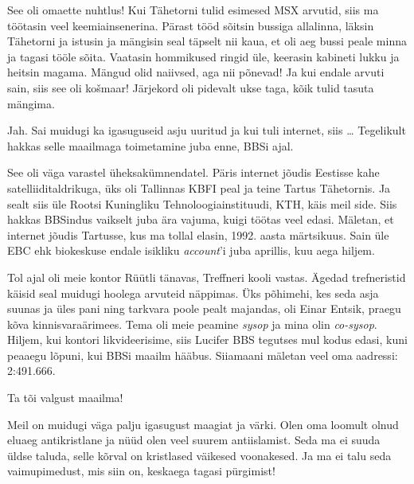 See oli omaette nuhtlus! Kui Tähetorni 
tulid esimesed MSX arvutid, siis ma töötasin veel
keemiainsenerina. Pärast tööd sõitsin bussiga allalinna, läksin Tähetorni ja 
istusin ja mängisin seal täpselt nii kaua, et oli aeg bussi peale minna ja 
tagasi tööle sõita. Vaatasin hommikused ringid üle, keerasin kabineti lukku ja heitsin
magama. Mängud olid naiivsed, aga nii põnevad! Ja kui endale 
arvuti sain, siis see oli košmaar! Järjekord oli pidevalt ukse taga, kõik tulid 
tasuta mängima. 

Jah. Sai muidugi ka igasuguseid asju uuritud ja kui tuli internet, siis \ldots 
Tegelikult hakkas selle maailmaga toimetamine juba enne, BBSi ajal.


See oli väga varastel üheksakümnendatel. Päris internet jõudis Eestisse 
kahe satelliiditaldrikuga, üks oli Tallinnas KBFI peal ja teine Tartus 
Tähetornis. Ja sealt siis üle Rootsi Kuningliku 
Tehnoloogiainstituudi, KTH, käis meil 
side. Siis hakkas BBSindus vaikselt juba ära vajuma, kuigi töötas veel 
edasi. Mäletan, et internet jõudis Tartusse, kus ma tollal elasin, 
1992. aasta märtsikuus. Sain üle EBC ehk biokeskuse endale 
isikliku \emph{account}'i juba aprillis, kuu aega hiljem.

Tol ajal oli meie kontor Rüütli tänavas, Treffneri kooli vastas. Ägedad trefneristid käisid seal muidugi 
hoolega arvuteid näppimas. Üks põhimehi, kes seda asja suunas ja üles pani ning tarkvara poole pealt
majandas, oli Einar Entsik, 
praegu kõva kinnisvaraärimees. Tema oli meie peamine \emph{sysop} ja mina 
olin \emph{co-sysop}. Hiljem, kui kontori likvideerisime, siis Lucifer 
BBS tegutses mul kodus edasi, kuni peaaegu lõpuni, kui 
BBSi maailm hääbus. Siiamaani mäletan veel oma aadressi: 2:491.666.


Ta tõi valgust maailma! 

Meil on muidugi väga palju igasugust maagiat ja värki. Olen oma 
loomult olnud eluaeg antikristlane ja nüüd olen veel suurem 
antiislamist. Seda ma ei suuda üldse taluda, selle kõrval on kristlased 
väikesed voonakesed. Ja ma ei talu seda vaimupimedust, mis siin on, keskaega tagasi pürgimist! 

